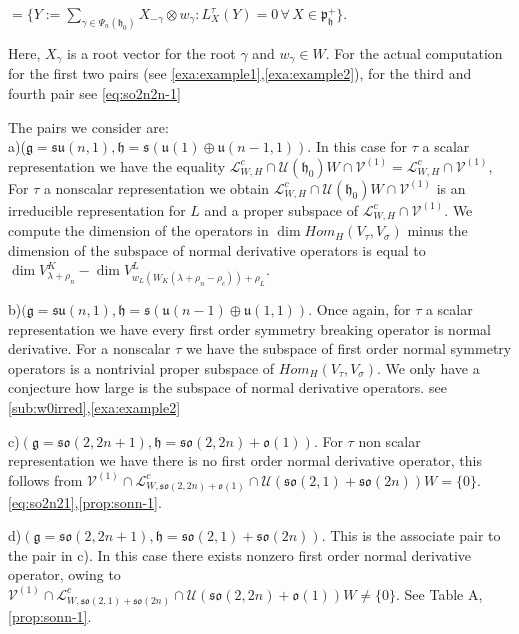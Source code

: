 \documentclass[12pt]{amsart}
\theoremstyle{definition}
\theoremstyle{remark}
\newcommand{\g}{\mathfrak{g}}
\newcommand{\h}{\mathfrak{h}}
\newcommand{\p}{\mathfrak p}
\numberwithin{equation}{section}
\begin{document}
\phantom{xxxxxxxxxxxx} $=\{ Y:=\sum_{\gamma \in \Psi_n(\h_0)} X_{-\gamma} \otimes w_\gamma : L_X^\tau(Y)=0 \, \forall \, X \in \p_\h^+ \}  $.

  Here, $X_\gamma$ is a root vector for the root $\gamma$ and $w_\gamma \in W$.
For the actual computation for the first two pairs  (see    \ref{exa:example1},\ref{exa:example2}), for the third and fourth pair see \ref{eq:so2n2n-1}



 The pairs we consider are:\\ a)($\g=\mathfrak{su}(n,1),   \h =\mathfrak s(\mathfrak u( 1 )\oplus \mathfrak{u}(n-1,1))$. In this case for $\tau$ a scalar representation we have the equality $\mathcal L_{W,H}^c \cap \mathcal U(\h_0)W\cap \mathcal V^{(1)}=\mathcal L_{W,H}^c \cap \mathcal V^{(1)}$, For $\tau$ a nonscalar representation we  obtain $\mathcal L_{W,H}^c \cap \mathcal U(\h_0)W\cap \mathcal V^{(1)}$ is an irreducible representation for $L$ and a proper subspace of $\mathcal L_{W,H}^c \cap \mathcal V^{(1)}$. We compute the dimension of the operators in $\dim Hom_H(V_\tau, V_\sigma)$ minus the dimension of the subspace of normal derivative operators is equal to $\dim V_{\lambda +\rho_n}^K -\dim V_{w_L(W_K(\lambda +\rho_n-\rho_c))+\rho_L}^L$.


b)$(\g=\mathfrak{su}(n,1),   \h =\mathfrak s(\mathfrak u( n-1)\oplus \mathfrak{u}( 1,1))$. Once again, for $\tau$ a scalar representation we have every first order symmetry breaking operator is normal derivative. For a nonscalar $\tau$ we have the subspace of first order normal symmetry operators is a nontrivial proper subspace of $Hom_H(V_\tau, V_\sigma) $. We only have a conjecture how large is the subspace of normal derivative operators. see \ref{sub:w0irred},\ref{exa:example2}





c)$(\g=\mathfrak{so}(2,2n+1),   \h =\mathfrak{so}(2,2n)+\mathfrak o( 1 ))$.
For $\tau$ non scalar representation we have there is no first order normal derivative operator, this follows from $\mathcal V^{(1)}\cap \mathcal L_{W, \mathfrak{so}(2,2n)+\mathfrak o( 1 )}^c \cap \mathcal U(\mathfrak{so}(2,1)+\mathfrak {so}(2n))W=\{0\}$. \ref{eq:so2n21},\ref{prop:sonn-1}.

d)$(\g=\mathfrak{so}(2,2n+1),   \h =\mathfrak{so}(2,1)+\mathfrak {so}(2n))$. This is the associate pair to the pair in c). In this case there exists nonzero first order normal derivative operator, owing to  $\mathcal V^{(1)}\cap \mathcal L_{W, \mathfrak{so}(2,1)+\mathfrak {so}(2n)  }^c \cap \mathcal U(\mathfrak{so}(2,2n)+\mathfrak o( 1 ) )W\not=\{0\}$. See Table A,  \ref{prop:sonn-1}.
\end{document}
